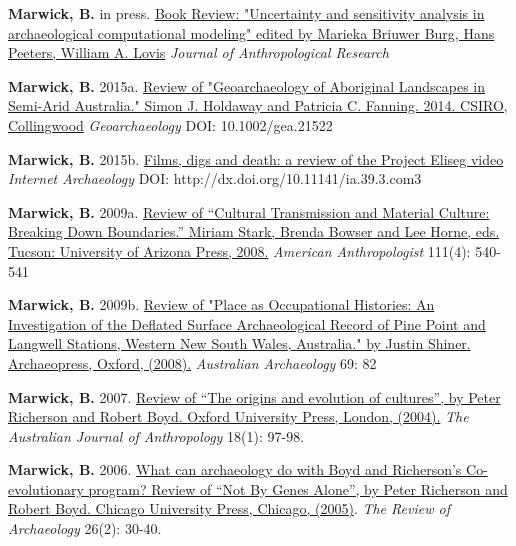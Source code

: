 \documentclass[11pt,article,oneside]{memoir}
\begin{document}
{{{{\ind \textbf{Marwick, B.} in press. \href{https://osf.io/preprints/socarxiv/v5du3/}{Book Review: "Uncertainty and sensitivity analysis in archaeological computational modeling" edited by Marieka Briuwer Burg, Hans Peeters, William A. Lovis} \textit{Journal of Anthropological Research}
} 

\ind \textbf{Marwick, B.} 2015a. \href{https://www.academia.edu/15214960/Review_of_Geoarchaeology_of_Aboriginal_Landscapes_in_Semi-Arid_Australia._Simon_J._Holdaway_and_Patricia_C._Fanning._2014._CSIRO_Collingwood._Geoarchaeology_Article_first_published_online_26_AUG_2015_DOI_10.1002_gea.21522}{Review of "Geoarchaeology of Aboriginal Landscapes in Semi-Arid Australia." Simon J. Holdaway and Patricia C. Fanning. 2014. CSIRO, Collingwood} \textit{Geoarchaeology}  DOI: 10.1002/gea.21522

\ind \textbf{Marwick, B.} 2015b. \href{http://intarch.ac.uk/journal/issue39/3/comms.cfm#tabs-3}{Films, digs and death: a review of the Project Eliseg video} \textit{Internet Archaeology} DOI: http://dx.doi.org/10.11141/ia.39.3.com3

\ind \textbf{Marwick, B.} 2009a. \href{http://faculty.washington.edu/bmarwick/PDFs/Marwick_2009_AA_Stark_Review.pdf}{Review of “Cultural Transmission and Material Culture: Breaking Down Boundaries.” Miriam Stark, Brenda Bowser and Lee Horne, eds. Tucson: University of Arizona Press, 2008.} \textit{American Anthropologist} 111(4): 540-541

\ind \textbf{Marwick, B.} 2009b. \href{http://faculty.washington.edu/bmarwick/PDFs/Marwick_2009_Shiner_review.pdf}{Review of "Place as Occupational Histories: An Investigation of the Deflated Surface Archaeological Record of Pine Point and Langwell Stations, Western New South Wales, Australia." by Justin Shiner. Archaeopress, Oxford, (2008).} \textit{Australian Archaeology} 69: 82

\ind \textbf{Marwick, B.} 2007. \href{http://faculty.washington.edu/bmarwick/PDFs/Evolution.pdf}{Review of “The origins and evolution of cultures”, by Peter Richerson and Robert Boyd. Oxford University Press, London, (2004).} \textit{The Australian Journal of Anthropology} 18(1): 97-98.

\ind \textbf{Marwick, B.} 2006. \href{http://faculty.washington.edu/bmarwick/PDFs/Marwick_2006_[B&R].pdf}{What can archaeology do with Boyd and Richerson’s Co-evolutionary program? Review of “Not By Genes Alone”, by Peter Richerson and Robert Boyd. Chicago University Press, Chicago, (2005)}. \textit{The Review of Archaeology} 26(2): 30-40.

}}}
\end{document}
